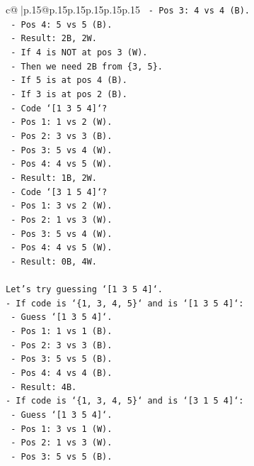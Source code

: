 \documentclass{article}
\begin{document}
{\begin{supertabular}{c@{$\;$}|p{.15\linewidth}@{}p{.15\linewidth}p{.15\linewidth}p{.15\linewidth}p{.15\linewidth}p{.15\linewidth}}
{{{\texttt{    {-} Pos 3: 4 vs 4 (B).} \\
\texttt{    {-} Pos 4: 5 vs 5 (B).} \\
\texttt{    {-} Result: 2B, 2W.} \\
\texttt{  {-} If 4 is NOT at pos 3 (W).} \\
\texttt{    {-} Then we need 2B from \{3, 5\}.} \\
\texttt{    {-} If 5 is at pos 4 (B).} \\
\texttt{    {-} If 3 is at pos 2 (B).} \\
\texttt{    {-} Code `{[}1 3 5 4{]}`?} \\
\texttt{      {-} Pos 1: 1 vs 2 (W).} \\
\texttt{      {-} Pos 2: 3 vs 3 (B).} \\
\texttt{      {-} Pos 3: 5 vs 4 (W).} \\
\texttt{      {-} Pos 4: 4 vs 5 (W).} \\
\texttt{      {-} Result: 1B, 2W.} \\
\texttt{    {-} Code `{[}3 1 5 4{]}`?} \\
\texttt{      {-} Pos 1: 3 vs 2 (W).} \\
\texttt{      {-} Pos 2: 1 vs 3 (W).} \\
\texttt{      {-} Pos 3: 5 vs 4 (W).} \\
\texttt{      {-} Pos 4: 4 vs 5 (W).} \\
\texttt{      {-} Result: 0B, 4W.} \\
\\ 
\texttt{Let's try guessing `{[}1 3 5 4{]}`.} \\
\texttt{{-} If code is `\{1, 3, 4, 5\}` and is `{[}1 3 5 4{]}`:} \\
\texttt{  {-} Guess `{[}1 3 5 4{]}`.} \\
\texttt{  {-} Pos 1: 1 vs 1 (B).} \\
\texttt{  {-} Pos 2: 3 vs 3 (B).} \\
\texttt{  {-} Pos 3: 5 vs 5 (B).} \\
\texttt{  {-} Pos 4: 4 vs 4 (B).} \\
\texttt{  {-} Result: 4B.} \\
\texttt{{-} If code is `\{1, 3, 4, 5\}` and is `{[}3 1 5 4{]}`:} \\
\texttt{  {-} Guess `{[}1 3 5 4{]}`.} \\
\texttt{  {-} Pos 1: 3 vs 1 (W).} \\
\texttt{  {-} Pos 2: 1 vs 3 (W).} \\
\texttt{  {-} Pos 3: 5 vs 5 (B).} \\
}}}
\end{supertabular}}
\end{document}
